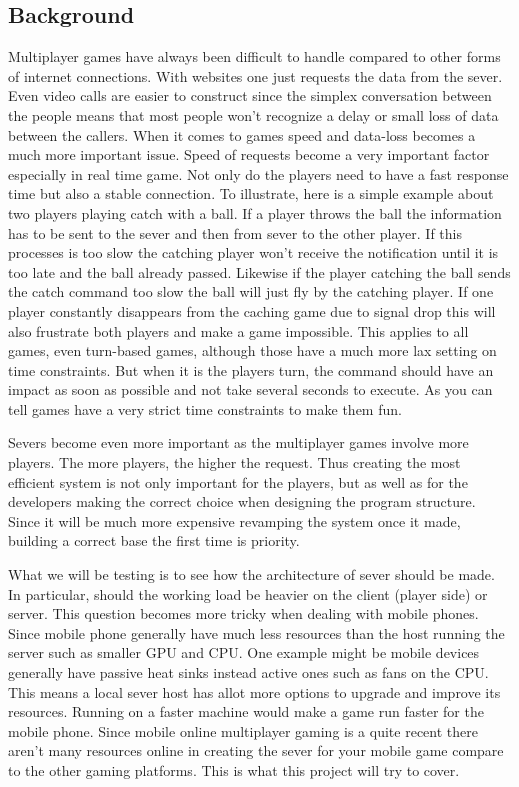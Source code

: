 \documentclass[12pt,a4paper,twoside]{report}
\begin{document}
\subsection{Background}

Multiplayer games have always been difficult to handle compared to other forms of internet connections. With websites one just requests the data from the sever. Even video calls are easier to construct since the simplex conversation between the people means that most people won't recognize a delay or small loss of data between the callers. When it comes to games speed and data-loss becomes a much more important issue. Speed of requests become a very important factor especially in real time game. Not only do the players need to have a fast response time but also a stable connection. To illustrate, here is a simple example about two players playing catch with a ball. If a player throws the ball the information has to be sent to the sever and then from sever to the other player. If this processes is too slow the catching player won't receive the notification until it is too late and the ball already passed. Likewise if the player catching the ball sends the catch command too slow the ball will just fly by the catching player. If one player constantly disappears from the caching game due to signal drop this will also frustrate both players and make a game impossible. This applies to all games, even turn-based games, although those have a much more lax setting on time constraints. But when it is the players turn, the command should have an impact as soon as possible and not take several seconds to execute. As you can tell games have a very strict time constraints to make them fun.

Severs become even more important as the multiplayer games involve more players. The more players, the higher the request. Thus creating the most efficient system is not only important for the players, but as well as for the developers making the correct choice when designing the program structure. Since it will be much more expensive revamping the system once it made, building a correct base the first time is priority. 

What we will be testing is to see how the architecture of sever should be made. In particular, should the working load be heavier on the client (player side) or server. This question becomes more tricky when dealing with mobile phones. Since mobile phone generally have much less resources than the host running the server such as smaller GPU and CPU. One example might be mobile devices generally have passive heat sinks instead active ones such as fans on the CPU. This means a local sever host has allot more options to upgrade and improve its resources. Running on a faster machine would make a game run faster for the mobile phone. Since mobile online multiplayer gaming is a quite recent there aren't many resources online in creating the sever for your mobile game compare to the other gaming platforms. This is what this project will try to cover. 
\end{document}
